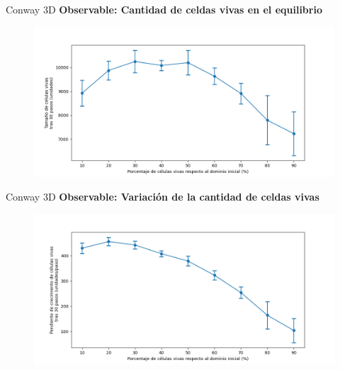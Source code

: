 \begin{frame}{Conway 3D}
    \textbf{Observable: Cantidad de celdas vivas en el equilibrio}
    \begin{figure}[H]
        \centering
        \includegraphics[width=0.8\linewidth]{pic/conway3d/size_vs_input}
        \label{fig:conway3d:size:density}
    \end{figure}
\end{frame}

\begin{frame}{Conway 3D}
    \textbf{Observable: Variación de la cantidad de celdas vivas}
    \begin{figure}[H]
        \centering
        \includegraphics[width=0.8\linewidth]{pic/conway3d/size_slope_vs_input}
        \label{fig:conway3d:size_slope:density}
    \end{figure}
\end{frame}

